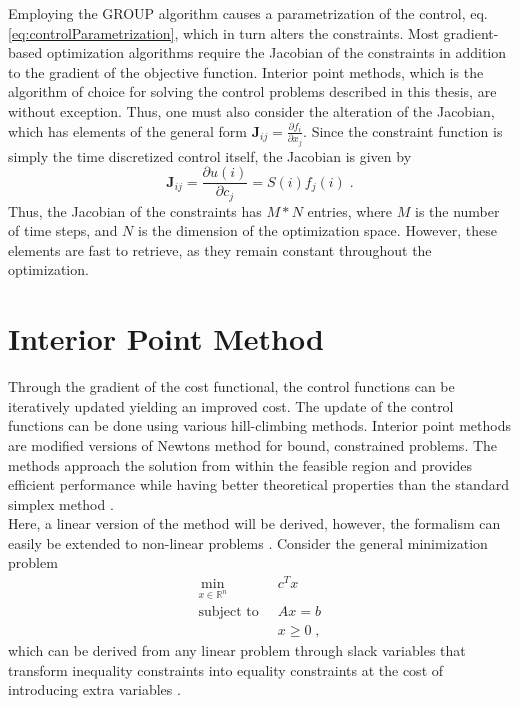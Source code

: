 Employing the GROUP algorithm causes a parametrization of the control, eq. \eqref{eq:controlParametrization}, which in turn alters the constraints. Most gradient-based optimization algorithms require the Jacobian of the constraints in addition to the gradient of the objective function. Interior point methods, which is the algorithm of choice for solving the control problems described in this thesis, are without exception. Thus, one must also consider the alteration of the Jacobian, which has elements of the general form $\boldsymbol{J}_{ij} = \frac{\partial f_i}{\partial x_j}$.
Since the constraint function is simply the time discretized control itself, the Jacobian is given by
\begin{equation}
	\boldsymbol{J}_{ij} = \frac{\partial u(i)}{\partial c_j} = S(i) f_j (i) \; .
\end{equation}
Thus, the Jacobian of the constraints has $M * N$ entries, where $M$ is the number of time steps, and $N$ is the dimension of the optimization space. However, these elements are fast to retrieve, as they remain constant throughout the optimization. 


\section{Interior Point Method}
Through the gradient of the cost functional, the control functions can be iteratively updated yielding an improved cost. The update of the control functions can be done using various hill-climbing methods.
Interior point methods are modified versions of Newtons method for bound, constrained problems. The methods approach the solution from within the feasible region and provides efficient performance while having better theoretical properties than the standard simplex method \cite{wright}.\\

Here, a linear version of the method will be derived, however, the formalism can easily be extended to non-linear problems \cite{wright}.
Consider the general minimization problem
 \begin{align*}
	\min_{x \in \mathbb{R}^n} \;  & \; c^T x \\
	\text{subject to} \;  & \; A x = b  \\
							& \; x \geq 0 \; ,
\end{align*}
which can be derived from any linear problem through slack variables that transform inequality constraints into equality constraints at the cost of introducing extra variables \cite{ipopt}.


